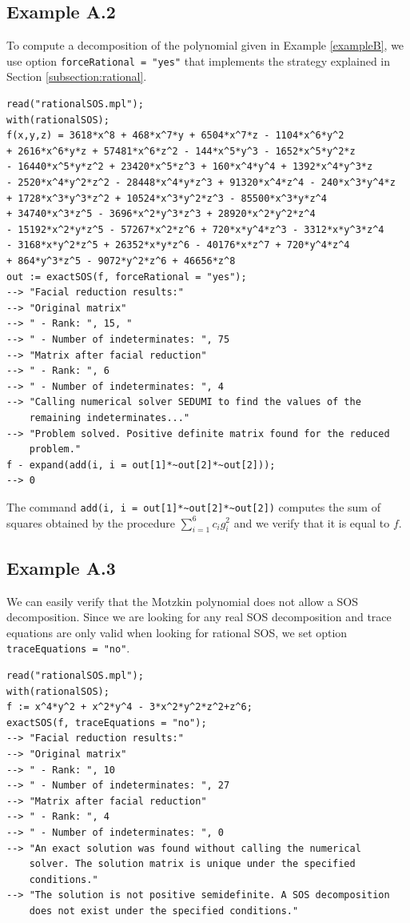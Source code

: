 \documentclass{amsart}
\theoremstyle{definition}
\theoremstyle{remark}
\numberwithin{equation}{section}
\begin{document}
\subsection*{Example A.2}
To compute a decomposition of the polynomial given in Example \ref{exampleB}, we use option \texttt{forceRational = "yes"} that implements the strategy explained in Section \ref{subsection:rational}. 

\begin{verbatim}
read("rationalSOS.mpl");
with(rationalSOS);
f(x,y,z) = 3618*x^8 + 468*x^7*y + 6504*x^7*z - 1104*x^6*y^2
+ 2616*x^6*y*z + 57481*x^6*z^2 - 144*x^5*y^3 - 1652*x^5*y^2*z
- 16440*x^5*y*z^2 + 23420*x^5*z^3 + 160*x^4*y^4 + 1392*x^4*y^3*z
- 2520*x^4*y^2*z^2 - 28448*x^4*y*z^3 + 91320*x^4*z^4 - 240*x^3*y^4*z
+ 1728*x^3*y^3*z^2 + 10524*x^3*y^2*z^3 - 85500*x^3*y*z^4
+ 34740*x^3*z^5 - 3696*x^2*y^3*z^3 + 28920*x^2*y^2*z^4
- 15192*x^2*y*z^5 - 57267*x^2*z^6 + 720*x*y^4*z^3 - 3312*x*y^3*z^4
- 3168*x*y^2*z^5 + 26352*x*y*z^6 - 40176*x*z^7 + 720*y^4*z^4
+ 864*y^3*z^5 - 9072*y^2*z^6 + 46656*z^8
out := exactSOS(f, forceRational = "yes");
--> "Facial reduction results:"
--> "Original matrix"
--> " - Rank: ", 15, "
--> " - Number of indeterminates: ", 75
--> "Matrix after facial reduction"
--> " - Rank: ", 6
--> " - Number of indeterminates: ", 4
--> "Calling numerical solver SEDUMI to find the values of the
    remaining indeterminates..."
--> "Problem solved. Positive definite matrix found for the reduced
    problem."
f - expand(add(i, i = out[1]*~out[2]*~out[2]));
--> 0
\end{verbatim}

The command \verb!add(i, i = out[1]*~out[2]*~out[2])! computes the sum of squares obtained by the procedure $\sum_{i=1}^6 c_i g_i^2$ and we verify that it is equal to $f$.

\subsection*{Example A.3}
We can easily verify that the Motzkin polynomial does not allow a SOS decomposition. Since we are looking for any real SOS decomposition and trace equations are only valid when looking for rational SOS, we set option \texttt{traceEquations = "no"}.

\begin{verbatim}
read("rationalSOS.mpl");
with(rationalSOS);
f := x^4*y^2 + x^2*y^4 - 3*x^2*y^2*z^2+z^6;
exactSOS(f, traceEquations = "no");
--> "Facial reduction results:"
--> "Original matrix"
--> " - Rank: ", 10
--> " - Number of indeterminates: ", 27
--> "Matrix after facial reduction"
--> " - Rank: ", 4
--> " - Number of indeterminates: ", 0
--> "An exact solution was found without calling the numerical
    solver. The solution matrix is unique under the specified
    conditions."
--> "The solution is not positive semidefinite. A SOS decomposition
    does not exist under the specified conditions."
\end{verbatim}
\end{document}
